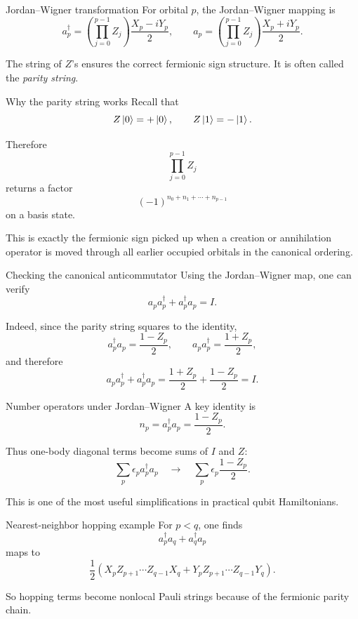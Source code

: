 \documentclass[aspectratio=169]{beamer}
\begin{document}
\begin{frame}{Jordan--Wigner transformation}
For orbital \(p\), the Jordan--Wigner mapping is
\[
a_p^\dagger
=
\left(\prod_{j=0}^{p-1} Z_j\right)\frac{X_p-iY_p}{2},
\qquad
a_p
=
\left(\prod_{j=0}^{p-1} Z_j\right)\frac{X_p+iY_p}{2}.
\]

The string of \(Z\)'s ensures the correct fermionic sign structure.
It is often called the \emph{parity string}.
\end{frame}

\begin{frame}{Why the parity string works}
Recall that
\[
Z \ket{0} = +\ket{0},\qquad Z\ket{1} = -\ket{1}.
\]

Therefore
\[
\prod_{j=0}^{p-1} Z_j
\]
returns a factor
\[
(-1)^{n_0+n_1+\cdots+n_{p-1}}
\]
on a basis state.

This is exactly the fermionic sign picked up when a creation or annihilation operator is moved through all earlier occupied orbitals in the canonical ordering.
\end{frame}

\begin{frame}{Checking the canonical anticommutator}
Using the Jordan--Wigner map, one can verify
\[
a_p a_p^\dagger + a_p^\dagger a_p = I.
\]

Indeed, since the parity string squares to the identity,
\[
a_p^\dagger a_p
=
\frac{1-Z_p}{2},
\qquad
a_p a_p^\dagger
=
\frac{1+Z_p}{2},
\]
and therefore
\[
a_p a_p^\dagger + a_p^\dagger a_p
=
\frac{1+Z_p}{2}+\frac{1-Z_p}{2}=I.
\]
\end{frame}

\begin{frame}{Number operators under Jordan--Wigner}
A key identity is
\[
n_p = a_p^\dagger a_p = \frac{1-Z_p}{2}.
\]

Thus one-body diagonal terms become sums of \(I\) and \(Z\):
\[
\sum_p \epsilon_p a_p^\dagger a_p
\quad \longrightarrow \quad
\sum_p \epsilon_p \frac{1-Z_p}{2}.
\]

This is one of the most useful simplifications in practical qubit Hamiltonians.
\end{frame}

\begin{frame}{Nearest-neighbor hopping example}
For \(p<q\), one finds
\[
a_p^\dagger a_q + a_q^\dagger a_p
\]
maps to
\[
\frac12
\left(
X_p Z_{p+1}\cdots Z_{q-1} X_q
+
Y_p Z_{p+1}\cdots Z_{q-1} Y_q
\right).
\]

So hopping terms become nonlocal Pauli strings because of the fermionic parity chain.
\end{frame}
\end{document}
